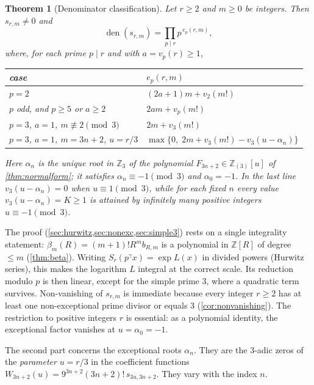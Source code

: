 \documentclass[11pt,reqno]{amsart}
\theoremstyle{definition}
\theoremstyle{remark}
\theoremstyle{plain}
\newtheorem{mainthm}{Theorem}
\newcommand{\Z}{\mathbb Z}
\newcommand{\Zloc}{\mathbb Z_{(3)}}
\newcommand{\den}{\operatorname{den}}
\begin{document}
\begin{mainthm}[Denominator classification]\label{thmA}
Let $r\ge2$ and $m\ge0$ be integers. Then $s_{r,m}\ne0$ and
\[
\den(s_{r,m})=\prod_{p\mid r}p^{\,e_p(r,m)},
\]
where, for each prime $p\mid r$ and with $a=v_p(r)\ge1$,
\begin{center}
\begin{tabular}{@{}ll@{}}
\toprule
case & $e_p(r,m)$\\
\midrule
$p=2$ & $(2a+1)m+v_2(m!)$\\
$p$ odd, and $p\ge5$ or $a\ge2$ & $2am+v_p(m!)$\\
$p=3$, $a=1$, $m\not\equiv2\pmod 3$ & $2m+v_3(m!)$\\
$p=3$, $a=1$, $m=3n+2$, $u=r/3$ & $\max\bigl\{0,\;2m+v_3(m!)-v_3(u-\alpha_n)\bigr\}$\\
\bottomrule
\end{tabular}
\end{center}
Here $\alpha_n$ is the unique root in $\Z_3$ of the polynomial $F_{3n+2}\in\Zloc[u]$ of \cref{thm:normalform}; it satisfies $\alpha_n\equiv-1\pmod3$ and $\alpha_0=-1$. In the last line $v_3(u-\alpha_n)=0$ when $u\equiv1\pmod3$, while for each fixed $n$ every value $v_3(u-\alpha_n)=K\ge1$ is attained by infinitely many positive integers $u\equiv-1\pmod 3$.
\end{mainthm}

The proof (\cref{sec:hurwitz,sec:nonexc,sec:simple3}) rests on a single integrality statement: $\beta_m(R)=(m+1)!R^m b_{R,m}$ is a polynomial in $\Z[R]$ of degree $\le m$ (\cref{thm:beta}). Writing $S_r(p^\gamma x)=\exp L(x)$ in divided powers (Hurwitz series), this makes the logarithm $L$ integral at the correct scale. Its reduction modulo $p$ is then linear, except for the simple prime $3$, where a quadratic term survives. Non-vanishing of $s_{r,m}$ is immediate because every integer $r\ge2$ has at least one non-exceptional prime divisor or equals $3$ (\cref{cor:nonvanishing}). The restriction to positive integers $r$ is essential: as a polynomial identity, the exceptional factor vanishes at $u=\alpha_0=-1$.

The second part concerns the exceptional roots $\alpha_n$. They are the $3$-adic zeros of the \emph{parameter} $u=r/3$ in the coefficient functions $W_{3n+2}(u)=9^{3n+2}(3n+2)!\,s_{3u,3n+2}$. They vary with the index $n$.
\end{document}
